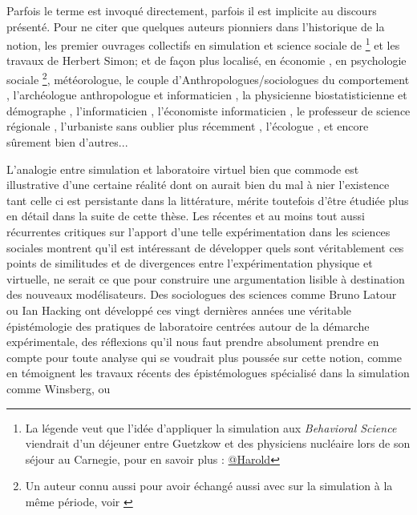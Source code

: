 Parfois le terme est invoqué directement, parfois il est implicite au discours présenté. Pour ne citer que quelques auteurs pionniers dans l'historique de la notion, les premier ouvrages collectifs en simulation et science sociale de \textcite{Guetzkow1962, Guetzkow1972} \footnote{La légende veut que l'idée d'appliquer la simulation aux \textit{Behavioral Science} viendrait d'un déjeuner entre Guetzkow et des physiciens nucléaire lors de son séjour au Carnegie, pour en savoir plus : \href{http://www.hawaii.edu/intlrel/pols635f/Guetzkow/hg.html}{@Harold} } et les travaux de Herbert Simon; et de façon plus localisé, en économie \textcite[915]{Shubik1960b}, en psychologie sociale \textcite{Abelson1968} \footnote{Un auteur connu aussi pour avoir échangé aussi avec \textcite{Boudon1967} sur la simulation à la même période, voir  \textcite{Padioleau1969}}, \textcite{Fleisher1965} météorologue, le couple d'Anthropologues/sociologues du comportement \textcite{Gullahorn1965}, l'archéologue anthropologue et informaticien \textcite{Doran1970}, la physicienne biostatisticienne et démographe \textcite{Sheps1971}, l'informaticien \textcite[3-4]{Forrester1971}, l'économiste informaticien \textcite{Naylor1966}, le professeur de science régionale \textcite[271]{Harris1966}, l'urbaniste \textcite[295]{Batty1976} sans oublier plus récemment \textcite{Epstein1996}, l'écologue \textcite{Grimm2006}, et encore sûrement bien d'autres...

L'analogie entre simulation et laboratoire virtuel bien que commode est illustrative d'une certaine réalité dont on aurait bien du mal à nier l'existence tant celle ci est persistante dans la littérature, mérite toutefois d'être étudiée plus en détail dans la suite de cette thèse. Les récentes et au moins tout aussi récurrentes critiques sur l'apport d'une telle expérimentation dans les sciences sociales montrent qu'il est intéressant de développer quels sont véritablement ces points de similitudes et de divergences entre l'expérimentation physique et virtuelle, ne serait ce que pour construire une argumentation lisible à destination des nouveaux modélisateurs. Des sociologues des sciences comme Bruno Latour ou Ian Hacking ont développé ces vingt dernières années une véritable épistémologie des pratiques de laboratoire centrées autour de la démarche expérimentale, des réflexions qu'il nous faut prendre absolument prendre en compte pour toute analyse qui se voudrait plus poussée sur cette notion, comme en témoignent les travaux récents des épistémologues spécialisé dans la simulation comme Winsberg, ou \textcite[204]{Varenne2012}

